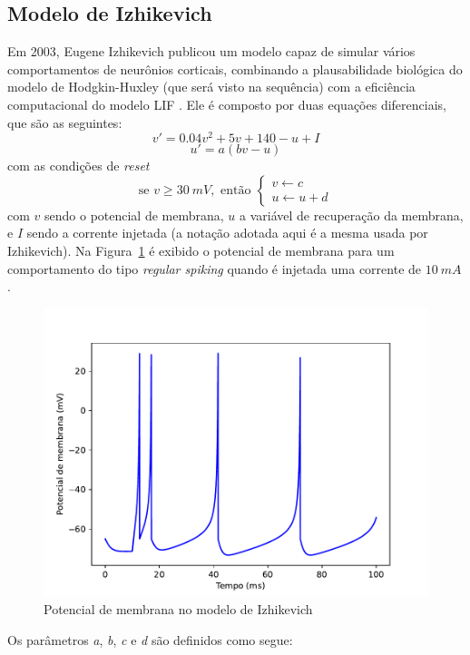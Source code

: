 \subsection{Modelo de Izhikevich}\label{sec:izhikevich}
Em 2003, Eugene Izhikevich publicou um modelo capaz de simular vários comportamentos de neurônios corticais, combinando a plausabilidade biológica do modelo de Hodgkin-Huxley (que será visto na sequência) com a eficiência computacional do modelo LIF \cite{izhikevich_simple_2003}. Ele é composto por duas equações diferenciais, que são as seguintes:
\begin{equation}\label{eq:izhikevich_v}
	v'=0.04v^2+5v+140-u+I
\end{equation}
\begin{equation}\label{eq:izhikevich_u}
	u'=a(bv-u)
\end{equation}
com as condições de \textit{reset}
\begin{equation}\label{eq:izhikevich_condicao}
	\text{se }v\geq30\ mV,\text{ então }\begin{cases}
		v\leftarrow c\\
		u\leftarrow u+d
	\end{cases}
\end{equation}
com $v$ sendo o potencial de membrana, $u$ a variável de recuperação da membrana, e $I$ sendo a corrente injetada (a notação adotada aqui é a mesma usada por Izhikevich). Na Figura~\ref{fig:izhikevich} é exibido o potencial de membrana para um comportamento do tipo \textit{regular spiking} quando é injetada uma corrente de $10\ mA$.
\begin{figure}[tb]
	\centering
	\caption[Potencial de membrana no modelo de Izhikevich]{Potencial de membrana no modelo de Izhikevich}
	\label{fig:izhikevich}
	\includegraphics[width=0.7\linewidth]{figs/izhikevich}
\end{figure}
Os parâmetros \textit{a}, \textit{b}, \textit{c} e \textit{d} são definidos como segue:

